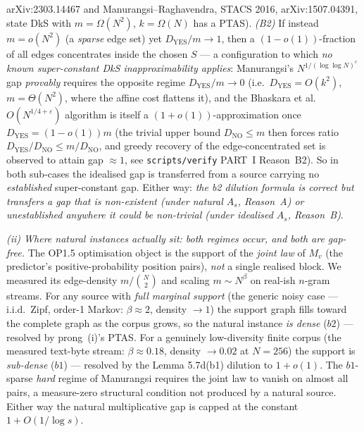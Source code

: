 \documentclass[
]{article}
\begin{document}
arXiv:2303.14467 and Manurangsi--Raghavendra, STACS 2016, arXiv:1507.04391,
state DkS with $m = \Omega(N^2)$, $k = \Omega(N)$ has a PTAS). \emph{(B2)} If
instead $m = o(N^2)$ (a \emph{sparse} edge set) yet $D_{\mathrm{YES}}/m \to
1$, then a $(1-o(1))$-fraction of all edges concentrates inside the chosen
$S$ --- a configuration to which \emph{no known super-constant DkS
inapproximability applies}: Manurangsi's $N^{1/(\log\log N)^c}$ gap
\emph{provably} requires the opposite regime $D_{\mathrm{YES}}/m \to 0$ (i.e.\
$D_{\mathrm{YES}} = O(k^2)$, $m = \Theta(N^2)$, where the affine cost flattens
it), and the Bhaskara et al.\ $O(N^{1/4+\varepsilon})$ algorithm is itself a
$(1+o(1))$-approximation once $D_{\mathrm{YES}} = (1-o(1))m$ (the trivial
upper bound $D_{\mathrm{NO}} \le m$ then forces ratio $D_{\mathrm{YES}}/
D_{\mathrm{NO}} \le m/D_{\mathrm{NO}}$, and greedy recovery of the
edge-concentrated set is observed to attain gap $\approx 1$, see
\texttt{scripts/verify} PART~I Reason~B2). So in both sub-cases the idealised
gap is transferred from a source carrying no \emph{established} super-constant
gap. Either way: \emph{the b2 dilution formula is correct but transfers a gap
that is non-existent (under natural $A_s$, Reason~A) or unestablished
anywhere it could be non-trivial (under idealised $A_s$, Reason~B)}.

\emph{(ii) Where natural instances actually sit: both regimes occur, and
both are gap-free.} The OP1.5 optimisation object is the support of the
\emph{joint law} of $M_v$ (the predictor's positive-probability position
pairs), \emph{not} a single realised block. We measured its edge-density
$m/\binom{N}{2}$ and scaling $m \sim N^\beta$ on real-ish $n$-gram streams.
For any source with \emph{full marginal support} (the generic noisy case ---
i.i.d.\ Zipf, order-1 Markov: $\beta \approx 2$, density $\to 1$) the support
graph fills toward the complete graph as the corpus grows, so the natural
instance \emph{is dense} ($b2$) --- resolved by prong~(i)'s PTAS. For a
genuinely low-diversity finite corpus (the measured text-byte stream: $\beta
\approx 0.18$, density $\to 0.02$ at $N = 256$) the support is \emph{sub-dense}
($b1$) --- resolved by the Lemma 5.7d(b1) dilution to $1 + o(1)$. The
$b1$-sparse \emph{hard} regime of Manurangsi requires the joint law to vanish
on almost all pairs, a measure-zero structural condition not produced by a
natural source. Either way the natural multiplicative gap is capped at the
constant $1 + O(1/\log s)$.
\end{document}
